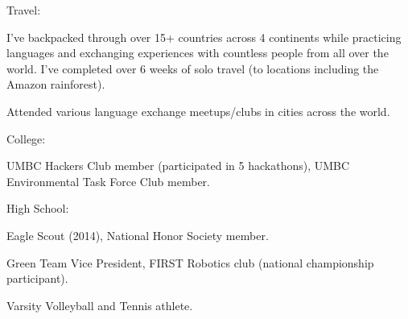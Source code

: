 
\begin{cventries}
  \cventry
    {Travel:} %
    {} %
    {} %
    {} %
    {
      \begin{cvitems} %
      \item {I've backpacked through over 15+ countries across 4 continents while practicing languages and exchanging experiences with countless people from all over the world.  I've completed over 6 weeks of solo travel (to locations including the Amazon rainforest).}
      \item {Attended various language exchange meetups/clubs in cities across the world.}
      \end{cvitems}
    }

  \cventry
    {College:} %
    {} %
    {} %
    {} %
    {
      \begin{cvitems} %
        \item {UMBC Hackers Club member (participated in 5 hackathons), UMBC Environmental Task Force Club member.}
      \end{cvitems}
    }

  \cventry
    {High School:} %
    {} %
    {} %
    {} %
    {
      \begin{cvitems} %
        \item {Eagle Scout (2014), National Honor Society member.}
        \item {Green Team Vice President, FIRST Robotics club (national championship participant).}
        \item {Varsity Volleyball and Tennis athlete.}
      \end{cvitems}
    }

\end{cventries}

\iffalse
\begin{cvskills}

  \cvskill
    {College}
    {UMBC Hackers Club member (participated in 5 hackathons), UMBC Environmental Task Force Club Member}

  \hline
  \cvskill
    {High School}
    {Eagle Scout (2014), National Honor Society member, FIRST Robotics club (national championship participant), Varsity Volleyball, Varsity Tennis.}
\end{cvskills}
\fi
